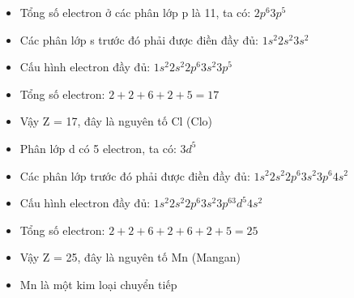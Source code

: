 \begin{loigiaibth}{4}
  \begin {itemize} \item Tổng số electron ở các phân lớp p là 11, ta có: $2p^6 3p^5$ \item Các phân lớp s trước đó phải được điền đầy đủ: $1s^2 2s^2 3s^2$ \item Cấu hình electron đầy đủ: $1s^2 2s^2 2p^6 3s^2 3p^5$ \item Tổng số electron: $2 + 2 + 6 + 2 + 5 = 17$ \item Vậy Z = 17, đây là nguyên tố Cl (Clo) \end {itemize}
\end{loigiaibth}
\begin{loigiaibth}{5}
  \begin {itemize} \item Phân lớp d có 5 electron, ta có: $3d^5$ \item Các phân lớp trước đó phải được điền đầy đủ: $1s^2 2s^2 2p^6 3s^2 3p^6 4s^2$ \item Cấu hình electron đầy đủ: $1s^2 2s^2 2p^6 3s^2 3p^63d^5 4s^2$ \item Tổng số electron: $2 + 2 + 6 + 2 + 6 + 2 + 5 = 25$ \item Vậy Z = 25, đây là nguyên tố Mn (Mangan) \item Mn là một kim loại chuyển tiếp \end {itemize}
\end{loigiaibth}
